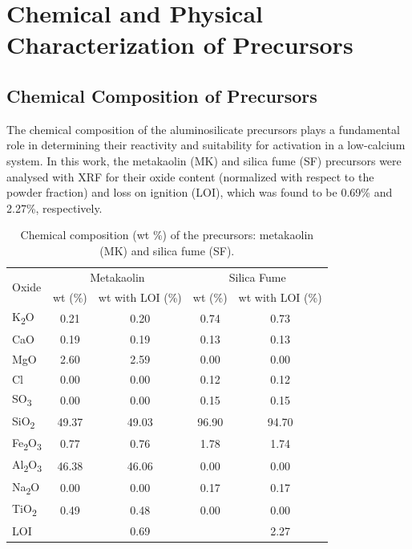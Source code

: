 \section{Chemical and Physical Characterization of Precursors}
\label{sec:chemical_and_physical_characterization_of_precursors}

\subsection{Chemical Composition of Precursors}
\label{sec:chemical_composition_of_precursors}

The chemical composition of the aluminosilicate precursors plays a fundamental role in determining their reactivity and suitability for activation in a low-calcium system. 
In this work, the metakaolin (MK) and silica fume (SF) precursors were analysed with XRF for their oxide content (normalized with respect to the powder fraction) and loss on ignition (LOI), which was found to be 0.69\% and 2.27\%, respectively.

\begin{table}[H]
    \centering
    \caption{Chemical composition (wt \%) of the precursors: metakaolin (MK) and silica fume (SF).}
    \label{tab:mk_sa_composition}
    \begin{tabular}{l c c c c}
        \hline
        \multirow{2}{*}{Oxide} & \multicolumn{2}{c}{Metakaolin} & \multicolumn{2}{c}{Silica Fume} \\
        \cline{2-5}
        & wt (\%) & wt with LOI (\%) & wt (\%) & wt with LOI (\%) \\
        \hline
        K\textsubscript{2}O & 0.21 & 0.20 & 0.74 & 0.73 \\
        CaO & 0.19  & 0.19 & 0.13 & 0.13 \\
        MgO & 2.60 & 2.59 & 0.00 & 0.00 \\
        Cl & 0.00 & 0.00 & 0.12 & 0.12 \\
        SO\textsubscript{3} & 0.00 & 0.00 & 0.15 & 0.15 \\
        SiO\textsubscript{2} & 49.37 & 49.03 & 96.90 & 94.70 \\
        Fe\textsubscript{2}O\textsubscript{3} & 0.77 & 0.76 & 1.78 & 1.74 \\
        Al\textsubscript{2}O\textsubscript{3} & 46.38 & 46.06 & 0.00 & 0.00 \\
        Na\textsubscript{2}O & 0.00 & 0.00 & 0.17 & 0.17 \\
        TiO\textsubscript{2} & 0.49 & 0.48 & 0.00 & 0.00 \\
        LOI &  & 0.69 &  & 2.27 \\
        \hline
    \end{tabular}
\end{table}

